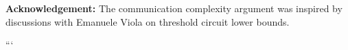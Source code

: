 \documentclass[11pt]{article}
\theoremstyle{definition}
\begin{document}
\vspace{1em}






\noindent






\textbf{Acknowledgement:} The communication complexity argument was inspired by discussions with Emanuele Viola on threshold circuit lower bounds.



































































```
\end{document}
